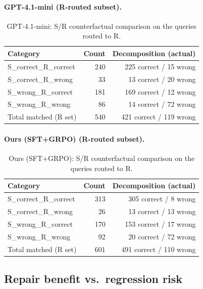 \documentclass{article}
\theoremstyle{plain}
\theoremstyle{definition}
\theoremstyle{remark}
\begin{document}
\paragraph{GPT-4.1-mini (R-routed subset).}
\begin{table}[t]
\centering
\small
\setlength{\tabcolsep}{6pt}
\begin{tabular}{lrr}
\toprule
\textbf{Category} & \textbf{Count} & \textbf{Decomposition (actual)} \\
\midrule
S\_correct\_R\_correct & 240 &
225 correct / 15 wrong \\
S\_correct\_R\_wrong & 33 &
13 correct / 20 wrong \\
S\_wrong\_R\_correct & 181 &
169 correct / 12 wrong \\
S\_wrong\_R\_wrong & 86 &
14 correct / 72 wrong \\
\midrule
Total matched (R set) & 540 & 421 correct / 119 wrong \\
\bottomrule
\end{tabular}
\caption{GPT-4.1-mini: S/R counterfactual comparison on the queries routed to R.}
\label{tab:gpt41_sr_matrix}
\end{table}

\paragraph{Ours (SFT+GRPO) (R-routed subset).}
\begin{table}[t]
\centering
\small
\setlength{\tabcolsep}{6pt}
\begin{tabular}{lrr}
\toprule
\textbf{Category} & \textbf{Count} & \textbf{Decomposition (actual)} \\
\midrule
S\_correct\_R\_correct & 313 &
305 correct / 8 wrong \\
S\_correct\_R\_wrong & 26 &
13 correct / 13 wrong \\
S\_wrong\_R\_correct & 170 &
153 correct / 17 wrong \\
S\_wrong\_R\_wrong & 92 &
20 correct / 72 wrong \\
\midrule
Total matched (R set) & 601 & 491 correct / 110 wrong \\
\bottomrule
\end{tabular}
\caption{Ours (SFT+GRPO): S/R counterfactual comparison on the queries routed to R.}
\label{tab:ours_sr_matrix}
\end{table}

\subsection{Repair benefit vs.\ regression risk}
\label{app:router_repair_regress}
\end{document}
